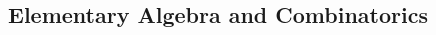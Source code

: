 \subsection{Elementary Algebra and Combinatorics}%
\label{sub:algebra}

\begin{multicols}{2}


\end{multicols}
